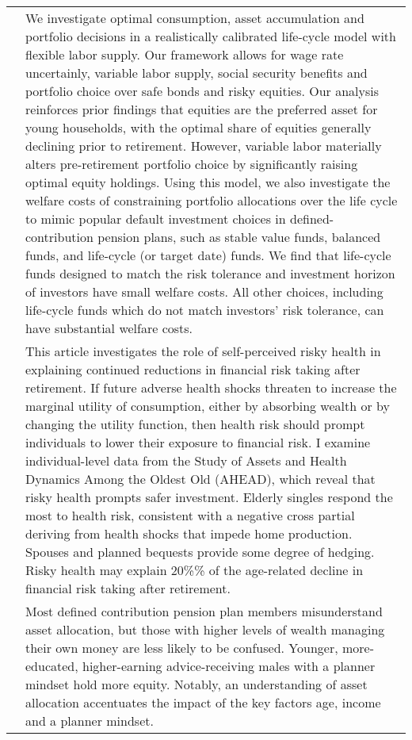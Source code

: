 \documentclass{article}
\begin{document}
\begin{tabular}{p{}p{}}
\cite{Gomes_2008} & We investigate optimal consumption, asset accumulation and portfolio decisions in a  realistically calibrated life-cycle model with flexible labor supply. Our framework allows for wage rate uncertainly, variable labor supply, social security benefits and portfolio choice over safe bonds and risky equities.  Our analysis reinforces prior findings that equities are the preferred asset for young households, with the optimal share of equities generally declining prior to retirement. However, variable labor materially alters pre-retirement portfolio choice by significantly raising optimal equity holdings. Using this model, we also investigate the welfare costs of constraining portfolio allocations over the life cycle to mimic popular default investment choices in defined-contribution pension plans, such as stable value funds, balanced funds, and life-cycle (or target date) funds. We find that life-cycle funds designed to match the risk tolerance and investment horizon of investors have small welfare costs. All other choices, including life-cycle funds which do not match investors' risk tolerance, can have substantial welfare costs. \\
\cite{Edwards_2008} & This article investigates the role of self-perceived risky health in explaining continued reductions in financial risk taking after retirement. If future adverse health shocks threaten to increase the marginal utility of consumption, either by absorbing wealth or by changing the utility function, then health risk should prompt individuals to lower their exposure to financial risk. I examine individual-level data from the Study of Assets and Health Dynamics Among the Oldest Old (AHEAD), which reveal that risky health prompts safer investment. Elderly singles respond the most to health risk, consistent with a negative cross partial deriving from health shocks that impede home production. Spouses and planned bequests provide some degree of hedging. Risky health may explain 20\%\% of the age-related decline in financial risk taking after retirement. \\
\cite{Bhandari_2008} & Most defined contribution pension plan members misunderstand asset allocation, but those with higher levels of wealth managing their own money are less likely to be confused. Younger, more-educated, higher-earning advice-receiving males with a planner mindset hold more equity. Notably, an understanding of asset allocation accentuates the impact of the key factors age, income and a planner mindset. \\

\end{tabular}
\end{document}
